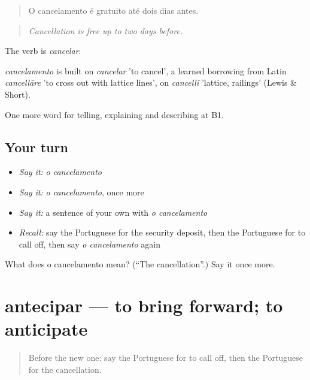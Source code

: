 \begin{quote}
O cancelamento é gratuito até dois dias antes.
\end{quote}

\begin{quote}
\emph{Cancellation is free up to two days before.}
\end{quote}

The verb is \emph{cancelar}.

\begin{cousinweb}
\emph{cancelamento} is built on \emph{cancelar} 'to cancel', a learned borrowing from Latin \emph{cancellāre} 'to cross out with lattice lines', on \emph{cancellī} 'lattice, railings' (Lewis \& Short).
\end{cousinweb}

\begin{grammarlens}[title={What you've built}]
One more word for telling, explaining and describing at B1.
\end{grammarlens}

\subsection*{Your turn}
\begin{itemize}
\raggedright
  \item \emph{Say it:} \emph{o cancelamento}
  \item \emph{Say it:} \emph{o cancelamento}, once more
  \item \emph{Say it:} a sentence of your own with \emph{o cancelamento}
  \item \emph{Recall:} say the Portuguese for the security deposit, then the Portuguese for to call off, then say \emph{o cancelamento} again
\end{itemize}

\begin{tcolorbox}[breakable,colback=teal!4,colframe=teal!35!black,title={Before you move on}]
What does o cancelamento mean? (\textquotedblleft{}The cancellation\textquotedblright{}.) Say it once more.
\end{tcolorbox}
\section[antecipar]{antecipar — to bring forward; to anticipate}

\label{lesson:PT-C427-antecipar}



\begin{quote}
Before the new one: say the Portuguese for to call off, then the Portuguese for the cancellation.
\end{quote}

